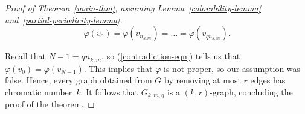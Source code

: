 \documentclass[10pt,a4paper]{amsart}
\begin{document}
\begin{proof}[Proof of Theorem~\ref{main-thm}, assuming Lemma~\ref{colorability-lemma} and~\ref{partial-periodicity-lemma}]
        \begin{equation}\label{contradiction-eqn}
            \varphi(v_0) = \varphi(v_{n_{k,m}}) = \dots = \varphi(v_{qn_{k,m}}).
        \end{equation}

        Recall that $N-1 = qn_{k,m}$, so (\ref{contradiction-eqn}) tells us that $\varphi(v_{0}) = \varphi(v_{N-1})$. This implies that $\varphi$ is not proper, so our assumption was false. Hence, every graph obtained from $G$ by removing at most $r$ edges has chromatic number~$k$. It follows that $G_{k,m,q}$ is a $(k,r)$-graph, concluding the proof of the theorem.
    \end{proof}
\end{document}
